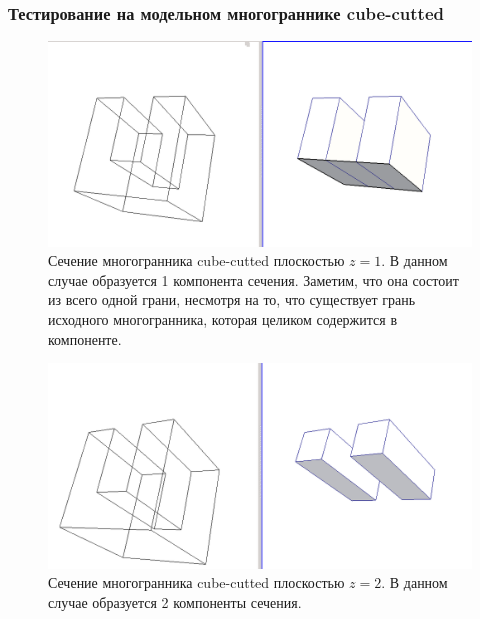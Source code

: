 \documentclass[a4paper,12pt, titlepage]{article}
\begin{document}
\subsubsection{Тестирование на модельном многограннике cube-cutted}
	\begin{flushleft}
		\begin{figure}[h]
		    \includegraphics[width=15cm]{cube-cutted/cube-cutted-1.png}
		    \caption{Сечение многогранника cube-cutted плоскостью $z = 1$. В данном случае образуется 1
		компонента сечения. Заметим, что она состоит из всего одной грани, несмотря на то, что
		существует грань исходного многогранника, которая целиком содержится в компоненте.}
		    \label{cube-cutted-1}
		\end{figure}
		
	\end{flushleft}
	\begin{flushleft}
		\begin{figure}[h]
		    \includegraphics[width=15cm]{cube-cutted/cube-cutted-2.png}
		    \caption{Сечение многогранника cube-cutted плоскостью $z = 2$. В данном случае образуется 2
		компоненты сечения.}
		    \label{cube-cutted-2}
		\end{figure}
	\end{flushleft}
\end{document}
